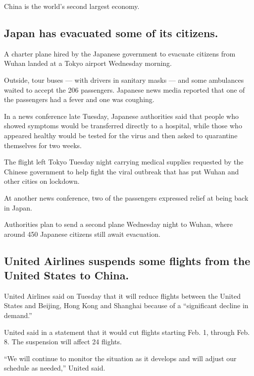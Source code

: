 China is the world's second largest economy.

\hypertarget{japan-has-evacuated-some-of-its-citizens}{%
\subsection{Japan has evacuated some of its
citizens.}\label{japan-has-evacuated-some-of-its-citizens}}

A charter plane hired by the Japanese government to evacuate citizens
from Wuhan landed at a Tokyo airport Wednesday morning.

Outside, tour buses --- with drivers in sanitary masks --- and some
ambulances waited to accept the 206 passengers. Japanese news media
reported that one of the passengers had a fever and one was coughing.

In a news conference late Tuesday, Japanese authorities said that people
who showed symptoms would be transferred directly to a hospital, while
those who appeared healthy would be tested for the virus and then asked
to quarantine themselves for two weeks.

The flight left Tokyo Tuesday night carrying medical supplies requested
by the Chinese government to help fight the viral outbreak that has put
Wuhan and other cities on lockdown.

At another news conference, two of the passengers expressed relief at
being back in Japan.

Authorities plan to send a second plane Wednesday night to Wuhan, where
around 450 Japanese citizens still await evacuation.

\hypertarget{united-airlines-suspends-some-flights-from-the-united-states-to-china}{%
\subsection{United Airlines suspends some flights from the United States
to
China.}\label{united-airlines-suspends-some-flights-from-the-united-states-to-china}}

United Airlines said on Tuesday that it will reduce flights between the
United States and Beijing, Hong Kong and Shanghai because of a
``significant decline in demand.''

United said in a statement that it would cut flights starting Feb. 1,
through Feb. 8. The suspension will affect 24 flights.

``We will continue to monitor the situation as it develops and will
adjust our schedule as needed,'' United said.

